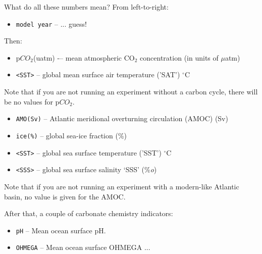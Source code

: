 \noindent What do all these numbers mean? From left-to-right:

\vspace{1mm}\begin{itemize}
\item[] \texttt{model year}  -- ... guess!
\end{itemize}\vspace{1mm}

\noindent Then:

\vspace{1mm}\begin{itemize}
\item[] p\(CO_{2}\)(uatm) -– mean atmospheric CO\(_{2}\) concentration (in units of \(\mu\)atm)
\item[] \texttt{<SST>} -- global mean surface air temperature ('SAT') $^{\circ}$C
\end{itemize}\vspace{1mm}

Note that if you are not running an experiment without a carbon cycle, there will be no values for p\(CO_{2}\).

\vspace{1mm}\begin{itemize}
\item[] \texttt{AMO(Sv)} -- Atlantic meridional overturning circulation (AMOC) (Sv)
\item[] \texttt{ice(\%)} -- global sea-ice fraction (\%)
\item[] \texttt{<SST>} -- global sea surface temperature ('SST') $^{\circ}$C
\item[] \texttt{<SSS>} -- global sea surface salinity ‘SSS’ (\%\textit{o})
\end{itemize}\vspace{1mm}

Note that if you are not running an experiment with a modern-like Atlantic basin, no value is given for the AMOC.

\vspace{1mm}
\noindent After that, a couple of carbonate chemistry indicators:

\vspace{1mm}\begin{itemize}
\item[] \texttt{pH} -- Mean ocean surface pH.
\item[] \texttt{OHMEGA} -- Mean ocean surface OHMEGA ...
\end{itemize}\vspace{1mm}

